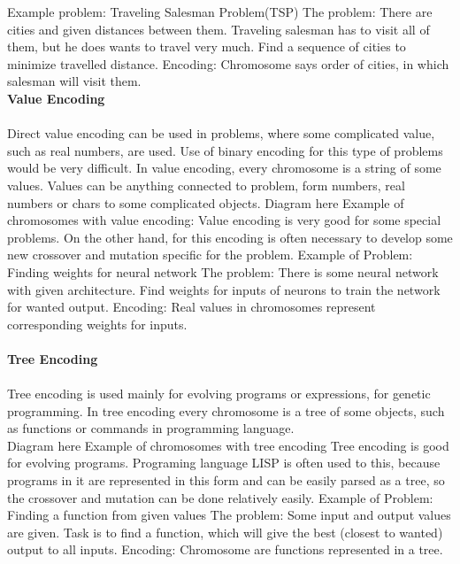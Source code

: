 \documentclass[a4paper, 12pt]{article}
\begin{document}
Example problem: Traveling Salesman Problem(TSP)
The problem: There are cities and given distances between them. Traveling salesman has to visit all of them, but he does wants to travel very
much. Find a sequence of cities to minimize travelled distance.
Encoding: Chromosome says order of cities, in which salesman will visit them.\\
\textbf{Value Encoding}\\~\\
 Direct value encoding can be used in problems, where some complicated value, such as real numbers, are used. Use of binary encoding for this
 type of problems would be very difficult. In value encoding, every chromosome is a string of some values. Values can be anything connected to 
problem, form numbers, real numbers or chars to some complicated objects. 
Diagram here
Example of chromosomes with value encoding:
Value encoding is very good for some special problems. On the other hand, for this encoding is often necessary to develop some new crossover and mutation specific for the problem. 
Example of Problem: Finding weights for neural network
The problem: There is some neural network with given architecture. Find weights for inputs of neurons to train the network for wanted output.
Encoding: Real values in chromosomes represent corresponding weights for inputs.\\~\\
\textbf{Tree Encoding}\\~\\
Tree encoding is used mainly for evolving programs or expressions, for genetic programming. In tree encoding every chromosome is a tree of some objects, such as functions or commands in programming language. \\
Diagram here
 Example of chromosomes with tree encoding
Tree encoding is good for evolving programs. Programing language LISP is often used to this, because programs in it are represented in this form and can be easily parsed as a tree, so the crossover and mutation can be done relatively easily.
Example of Problem: Finding a function from given values
The problem: Some input and output values are given. Task is to find a function, which will give the best (closest to wanted) output to all inputs.
Encoding: Chromosome are functions represented in a tree.\\~\\
\end{document}
